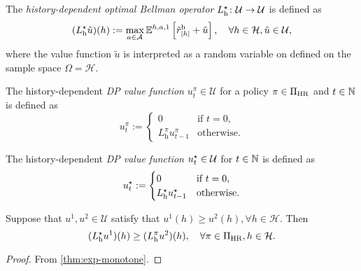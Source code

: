 \begin{definition}\label{def:DPhopt} 
The \emph{history-dependent optimal Bellman operator} $L_{\mathrm{h}}^{\star} \colon \mathcal{U} \to \mathcal{U}$ is defined as
  \[
    (L^{\star}_{\mathrm{h}} \tilde{u}) (h)
    :=
    \max_{a\in \mathcal{A}} \mathbb{E}^{h, a, 1} \left[ \tilde{r}^{\mathrm{h}}_{|h|} + \tilde{u} \right], \quad \forall h\in \mathcal{H}, \tilde{u} \in \mathcal{U},
  \]
  where the value function $\tilde{u}$ is interpreted as a random variable on defined on the sample space $\Omega = \mathcal{H}$.
  \leanok
\end{definition}

\begin{definition} \label{def:u-dp-pi}
  The history-dependent \emph{DP value function} $u_t^{\pi} \in \mathcal{U}$ for a policy $\pi\in \Pi_{\mathrm{HR}}$ and $t\in \mathbb{N}$ is defined as
  \[
   u_t^{\pi} :=
   \begin{cases}
     0 &\text{if } t = 0, \\
     L_{\mathrm{h}}^{\pi} u_{t-1}^{\pi} &\text{otherwise}.
   \end{cases}
 \]
 \leanok
\end{definition}

\begin{definition} \label{def:u-dp-opt}
  The history-dependent \emph{DP value function} $u_t^{\star} \in \mathcal{U}$ for $t\in \mathbb{N}$ is defined as
  \[
   u_t^{\star}  :=
   \begin{cases}
     0 &\text{if } t = 0, \\
     L_{\mathrm{h}}^{\star} u_{t-1}^{\star} &\text{otherwise}.
   \end{cases}
 \]
 \leanok
\end{definition}

\begin{lemma}\label{thm:dp-opt-ge-dp-pi}
  Suppose that $u^1, u^2 \in \mathcal{U}$ satisfy that $u^1(h) \ge u^2(h), \forall h\in \mathcal{H}$. Then
  \[
   (L_{\mathrm{h}}^{\star} u^1)(h) \ge  
   (L_{\mathrm{h}}^{\pi} u^2)(h), \quad \forall \pi\in \Pi_{\mathrm{HR}}, h\in \mathcal{H}.
  \]
\end{lemma}
\begin{proof}
  From \cref{thm:exp-monotone}.
\end{proof}

